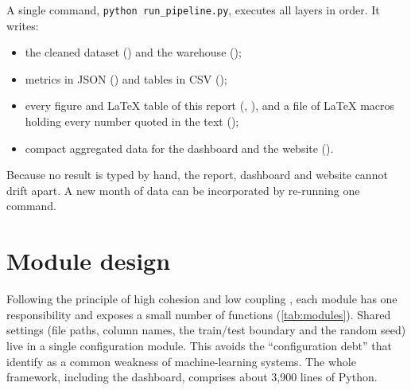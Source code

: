 A single command, \texttt{python run\_pipeline.py}, executes all layers in order. It writes:
\begin{itemize}
  \item the cleaned dataset () and the warehouse ();
  \item metrics in JSON () and tables in CSV ();
  \item every figure and \LaTeX{} table of this report (, ), and a
        file of \LaTeX{} macros holding every number quoted in the text ();
  \item compact aggregated data for the dashboard and the website ().
\end{itemize}
Because no result is typed by hand, the report, dashboard and website cannot drift apart. A new month of data
can be incorporated by re-running one command.

\section{Module design}
Following the principle of high cohesion and low coupling \citep{pressman2020}, each module has one
responsibility and exposes a small number of functions (\cref{tab:modules}). Shared settings (file paths, column
names, the train/test boundary and the random seed) live in a single configuration module. This avoids the
``configuration debt'' that \citet{sculley2015} identify as a common weakness of machine-learning systems. The
whole framework, including the dashboard, comprises about 3,900 lines of Python.

